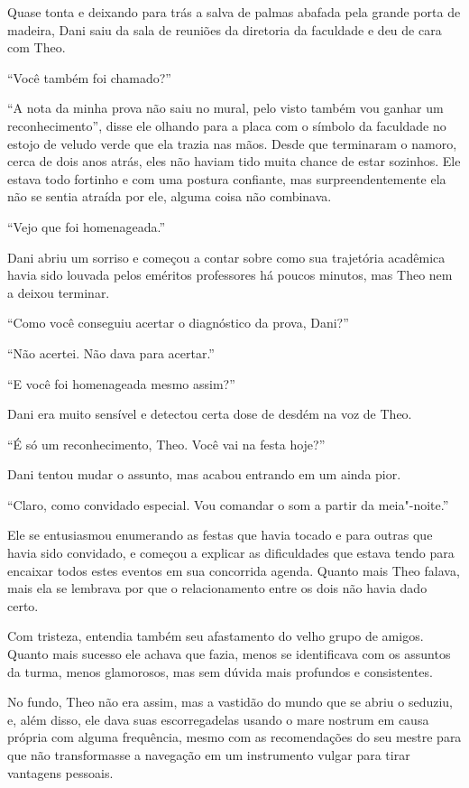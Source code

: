 Quase tonta e deixando para trás a salva de palmas abafada pela grande
porta de madeira, Dani saiu da sala de reuniões da diretoria da
faculdade e deu de cara com Theo.

``Você também foi chamado?''

``A nota da minha prova não saiu no mural, pelo visto também vou ganhar
um reconhecimento'', disse ele olhando para a placa com o símbolo da
faculdade no estojo de veludo verde que ela trazia nas mãos. Desde que
terminaram o namoro, cerca de dois anos atrás, eles não haviam tido
muita chance de estar sozinhos. Ele estava todo fortinho e com uma postura
confiante, mas surpreendentemente ela não se sentia atraída por ele,
alguma coisa não combinava.

``Vejo que foi homenageada.''

Dani abriu um sorriso e começou a contar sobre como sua trajetória
acadêmica havia sido louvada pelos eméritos professores há poucos
minutos, mas Theo nem a deixou terminar.

``Como você conseguiu acertar o diagnóstico da prova, Dani?''

``Não acertei. Não dava para acertar.''

``E você foi homenageada mesmo assim?''

Dani era muito sensível e detectou certa dose de desdém na voz de Theo.

``É só um reconhecimento, Theo. Você vai na festa hoje?''

Dani tentou mudar o assunto, mas acabou entrando em um ainda pior.

``Claro, como convidado especial. Vou comandar o som a partir da
meia"-noite.''

Ele se entusiasmou enumerando as festas que havia tocado e para outras
que havia sido convidado, e começou a explicar as dificuldades que
estava tendo para encaixar todos estes eventos em sua concorrida agenda.
Quanto mais Theo falava, mais ela se lembrava por que o relacionamento
entre os dois não havia dado certo.

Com tristeza, entendia também seu afastamento do velho grupo de amigos.
Quanto mais sucesso ele achava que fazia, menos se identificava com
os assuntos da turma, menos glamorosos, mas sem dúvida mais profundos e
consistentes.

No fundo, Theo não era assim, mas a vastidão do mundo que se abriu o
seduziu, e, além disso, ele dava suas escorregadelas usando o mare
nostrum em causa própria com alguma frequência, mesmo com as recomendações
do seu mestre para que não transformasse a navegação em um instrumento
vulgar para tirar vantagens pessoais.


